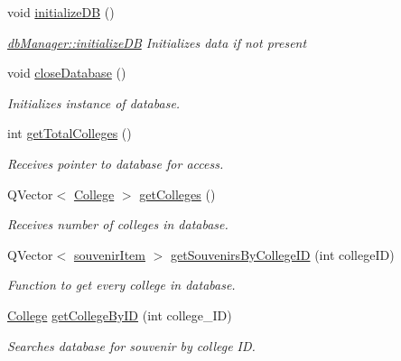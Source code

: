 \begin{DoxyCompactItemize}
\item 
\mbox{\label{classdb_manager_a6980cc0fa5fdc50934944c6f17b6980a}} 
void \mbox{\hyperlink{classdb_manager_a6980cc0fa5fdc50934944c6f17b6980a}{initialize\+DB}} ()
\begin{DoxyCompactList}\small\item\em \mbox{\hyperlink{classdb_manager_a6980cc0fa5fdc50934944c6f17b6980a}{db\+Manager\+::initialize\+DB}} Initializes data if not present \end{DoxyCompactList}\item 
void \mbox{\hyperlink{classdb_manager_a4170bc104b663300dee1fd7390a6ae63}{close\+Database}} ()
\begin{DoxyCompactList}\small\item\em Initializes instance of database. \end{DoxyCompactList}\item 
int \mbox{\hyperlink{classdb_manager_ae211811d8431bd57bd250c2ab753f691}{get\+Total\+Colleges}} ()
\begin{DoxyCompactList}\small\item\em Receives pointer to database for access. \end{DoxyCompactList}\item 
Q\+Vector$<$ \mbox{\hyperlink{struct_college}{College}} $>$ \mbox{\hyperlink{classdb_manager_aad9d2f24ac9c74728393502b6c04a0b8}{get\+Colleges}} ()
\begin{DoxyCompactList}\small\item\em Receives number of colleges in database. \end{DoxyCompactList}\item 
Q\+Vector$<$ \mbox{\hyperlink{structsouvenir_item}{souvenir\+Item}} $>$ \mbox{\hyperlink{classdb_manager_a91281dfbeb41cebfa8a633e3a7e12a5e}{get\+Souvenirs\+By\+College\+ID}} (int college\+ID)
\begin{DoxyCompactList}\small\item\em Function to get every college in database. \end{DoxyCompactList}\item 
\mbox{\hyperlink{struct_college}{College}} \mbox{\hyperlink{classdb_manager_a1ad8ef74ddb1a0022a1598ef9e60cd6f}{get\+College\+By\+ID}} (int college\+\_\+\+ID)
\begin{DoxyCompactList}\small\item\em Searches database for souvenir by college ID. \end{DoxyCompactList}\item 

\end{DoxyCompactItemize}
